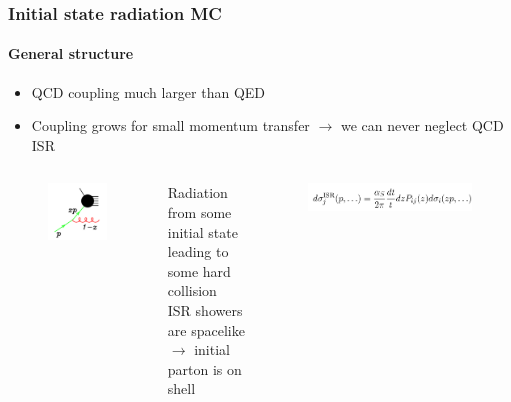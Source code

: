 \documentclass[aspectratio=43]{beamer}
\begin{document}
\begin{frame}

\frametitle{Initial state radiation MC}
\framesubtitle{General structure}
	
	\begin{itemize}
		\item \footnotesize QCD coupling much larger than QED
		\item \footnotesize Coupling grows for small momentum transfer $\rightarrow$ we can never neglect QCD ISR
	\end{itemize}
	
	\vspace{0.5cm}
	
	\begin{columns}
		
		
		\begin{figure}
			\includegraphics[width = 2.5 cm]{plots/ISR_shower0.png}
		\end{figure}
		
		
		\footnotesize Radiation from some initial state leading to some hard collision \\
		\footnotesize ISR showers are spacelike $\rightarrow$ initial parton is on shell

		\begin{figure}
			\includegraphics[width = 5.5 cm]{plots/ISR_shower0_eq.png}
		\end{figure}

	\end{columns}

\end{frame}
\end{document}

